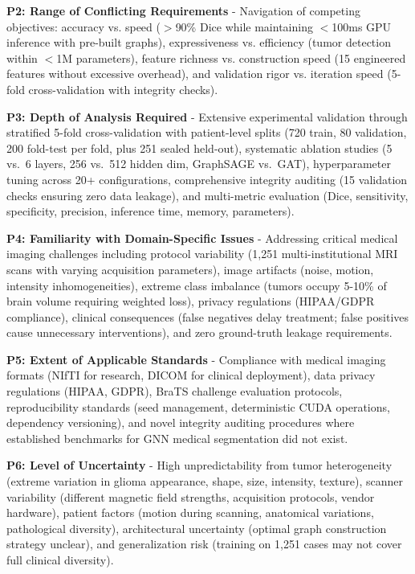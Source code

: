 \documentclass{article}
\begin{document}
\textbf{P2: Range of Conflicting Requirements} - Navigation of competing objectives: accuracy vs. speed ($>$90\% Dice while maintaining $<$100ms GPU inference with pre-built graphs), expressiveness vs. efficiency (tumor detection within $<$1M parameters), feature richness vs. construction speed (15 engineered features without excessive overhead), and validation rigor vs. iteration speed (5-fold cross-validation with integrity checks).

\textbf{P3: Depth of Analysis Required} - Extensive experimental validation through stratified 5-fold cross-validation with patient-level splits (720 train, 80 validation, 200 fold-test per fold, plus 251 sealed held-out), systematic ablation studies (5 vs.\ 6 layers, 256 vs.\ 512 hidden dim, GraphSAGE vs.\ GAT), hyperparameter tuning across 20+ configurations, comprehensive integrity auditing (15 validation checks ensuring zero data leakage), and multi-metric evaluation (Dice, sensitivity, specificity, precision, inference time, memory, parameters).

\textbf{P4: Familiarity with Domain-Specific Issues} - Addressing critical medical imaging challenges including protocol variability (1,251 multi-institutional MRI scans with varying acquisition parameters), image artifacts (noise, motion, intensity inhomogeneities), extreme class imbalance (tumors occupy 5-10\% of brain volume requiring weighted loss), privacy regulations (HIPAA/GDPR compliance), clinical consequences (false negatives delay treatment; false positives cause unnecessary interventions), and zero ground-truth leakage requirements.

\textbf{P5: Extent of Applicable Standards} - Compliance with medical imaging formats (NIfTI for research, DICOM for clinical deployment), data privacy regulations (HIPAA, GDPR), BraTS challenge evaluation protocols, reproducibility standards (seed management, deterministic CUDA operations, dependency versioning), and novel integrity auditing procedures where established benchmarks for GNN medical segmentation did not exist.

\textbf{P6: Level of Uncertainty} - High unpredictability from tumor heterogeneity (extreme variation in glioma appearance, shape, size, intensity, texture), scanner variability (different magnetic field strengths, acquisition protocols, vendor hardware), patient factors (motion during scanning, anatomical variations, pathological diversity), architectural uncertainty (optimal graph construction strategy unclear), and generalization risk (training on 1,251 cases may not cover full clinical diversity).
\end{document}
